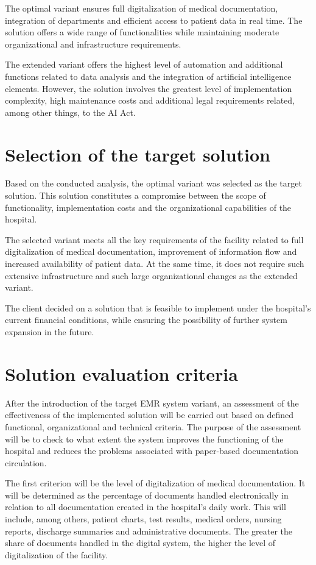     The optimal variant ensures full digitalization of medical documentation, integration of departments and efficient access to patient data in real time. The solution offers a wide range of functionalities while maintaining moderate organizational and infrastructure requirements.

    The extended variant offers the highest level of automation and additional functions related to data analysis and the integration of artificial intelligence elements. However, the solution involves the greatest level of implementation complexity, high maintenance costs and additional legal requirements related, among other things, to the AI Act.

    \section{Selection of the target solution}

    Based on the conducted analysis, the optimal variant was selected as the target solution. This solution constitutes a compromise between the scope of functionality, implementation costs and the organizational capabilities of the hospital.

    The selected variant meets all the key requirements of the facility related to full digitalization of medical documentation, improvement of information flow and increased availability of patient data. At the same time, it does not require such extensive infrastructure and such large organizational changes as the extended variant.

    The client decided on a solution that is feasible to implement under the hospital's current financial conditions, while ensuring the possibility of further system expansion in the future.
    \section{Solution evaluation criteria}
    After the introduction of the target EMR system variant, an assessment of the effectiveness of the implemented solution will be carried out based on defined functional, organizational and technical criteria. The purpose of the assessment will be to check to what extent the system improves the functioning of the hospital and reduces the problems associated with paper-based documentation circulation.

    The first criterion will be the level of digitalization of medical documentation. It will be determined as the percentage of documents handled electronically in relation to all documentation created in the hospital's daily work. This will include, among others, patient charts, test results, medical orders, nursing reports, discharge summaries and administrative documents. The greater the share of documents handled in the digital system, the higher the level of digitalization of the facility.

